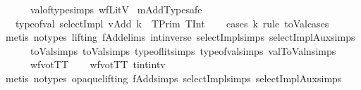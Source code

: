 \begin{isabellebody}
\ \ \ \ \ \ val{\isacharunderscore}{\kern0pt}of{\isacharunderscore}{\kern0pt}type{\isachardot}{\kern0pt}simps\ wfLitV{\isacharparenright}{\kern0pt}%
\endisatagproof
{\isafoldproof}%
%
\isadelimproof
\isanewline
%
\endisadelimproof
\isanewline
{}\isamarkupfalse%
\ mAdd{}Typesafe{\isacharcolon}{\kern0pt}\isanewline
\ \ \ {\isachardoublequoteopen}type{\isacharunderscore}{\kern0pt}of{\isacharunderscore}{\kern0pt}val\ {\isacharparenleft}{\kern0pt}selectImpl\ vAdd{}\ k{\isacharparenright}{\kern0pt}\ {\isacharequal}{\kern0pt}\ {\isacharparenleft}{\kern0pt}TPrim\ TInt{\isacharparenright}{\kern0pt}{\isachardoublequoteclose}\isanewline
%
\isadelimproof
\ \ %
\endisadelimproof
%
\isatagproof
{}\isamarkupfalse%
\ {\isacharparenleft}{\kern0pt}cases\ k\ rule{\isacharcolon}{\kern0pt}\ toVal{}{}{}{}{\isachardot}{\kern0pt}cases{\isacharparenright}{\kern0pt}\isanewline
\ \ \isamarkupfalse%
\ {\isacharparenleft}{\kern0pt}metis\ {\isacharparenleft}{\kern0pt}no{\isacharunderscore}{\kern0pt}types{\isacharcomma}{\kern0pt}\ lifting{\isacharparenright}{\kern0pt}\ fAdd{}{\isachardot}{\kern0pt}elims\ int{\isacharunderscore}{\kern0pt}inverse{\isacharunderscore}{\kern0pt}{}\ selectImpl{\isachardot}{\kern0pt}simps\ selectImplAux{\isachardot}{\kern0pt}simps{\isacharparenleft}{\kern0pt}{}{\isacharparenright}{\kern0pt}\isanewline
\ \ \ \ \ \ toVal{}{\isachardot}{\kern0pt}simps{\isacharparenleft}{\kern0pt}{}{\isacharparenright}{\kern0pt}\ toVal{}{}{}{}{\isachardot}{\kern0pt}simps{\isacharparenleft}{\kern0pt}{}{\isacharcomma}{\kern0pt}{}{\isacharparenright}{\kern0pt}\ type{\isacharunderscore}{\kern0pt}of{\isacharunderscore}{\kern0pt}lit{\isachardot}{\kern0pt}simps{\isacharparenleft}{\kern0pt}{}{\isacharparenright}{\kern0pt}\ type{\isacharunderscore}{\kern0pt}of{\isacharunderscore}{\kern0pt}val{\isachardot}{\kern0pt}simps{\isacharparenleft}{\kern0pt}{}{\isacharparenright}{\kern0pt}\ val{}ToValn{\isachardot}{\kern0pt}simps{\isacharparenleft}{\kern0pt}{}{\isacharparenright}{\kern0pt}\isanewline
\ \ \ \ \ \ wfvotTT{\isacharparenright}{\kern0pt}\isanewline
\ \ \isamarkupfalse%
\ wfvotTT\ tint{\isacharunderscore}{\kern0pt}intv\isanewline
\ \ \isamarkupfalse%
\ {\isacharparenleft}{\kern0pt}metis\ {\isacharparenleft}{\kern0pt}no{\isacharunderscore}{\kern0pt}types{\isacharcomma}{\kern0pt}\ opaque{\isacharunderscore}{\kern0pt}lifting{\isacharparenright}{\kern0pt}\ fAdd{}{\isachardot}{\kern0pt}simps{\isacharparenleft}{\kern0pt}{}{\isacharparenright}{\kern0pt}\ selectImpl{\isachardot}{\kern0pt}simps\ selectImplAux{\isachardot}{\kern0pt}simps{\isacharparenleft}{\kern0pt}{}{\isacharparenright}{\kern0pt}\isanewline

\end{isabellebody}
